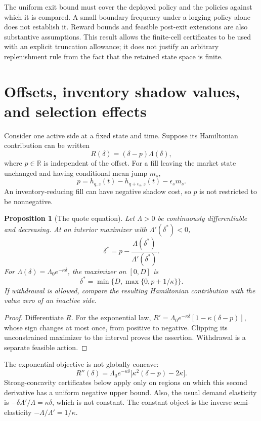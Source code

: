 \documentclass[11pt]{article}
\theoremstyle{plain}
\newtheorem{proposition}[theorem]{Proposition}
\theoremstyle{definition}
\theoremstyle{remark}
\newcommand{\R}{\mathbb R}
\begin{document}
The uniform exit bound must cover the deployed policy and the policies
against which it is compared. A small boundary frequency under a
logging policy alone does not establish it. Reward bounds and feasible
post-exit extensions are also substantive assumptions. This result
allows the finite-cell certificates to be used with an explicit
truncation allowance; it does not justify an arbitrary replenishment
rule from the fact that the retained state space is finite.

\section{Offsets, inventory shadow values, and selection effects}

Consider one active side at a fixed state and time. Suppose its
Hamiltonian contribution can be written
\[
R(\delta)=(\delta-p)\Lambda(\delta),
\]
where \(p\in\R\) is independent of the offset. For a fill leaving the
market state unchanged and having conditional mean jump \(m_s\),
\[
p=h_{q,z}(t)-h_{q+\epsilon_s,z}(t)-\epsilon_s m_s.
\]
An inventory-reducing fill can have negative shadow cost, so \(p\) is
not restricted to be nonnegative.

\begin{proposition}[The quote equation]\label{prop:quote}
Let \(\Lambda>0\) be continuously differentiable and decreasing.
At an interior maximizer with \(\Lambda'(\delta^\ast)<0\),
\[
\delta^\ast=p-\frac{\Lambda(\delta^\ast)}{\Lambda'(\delta^\ast)}.
\]
For \(\Lambda(\delta)=\Lambda_0e^{-\kappa\delta}\), the maximizer
on \([0,D]\) is
\[
\delta^\ast=\min\{D,\max\{0,p+1/\kappa\}\}.
\]
If withdrawal is allowed, compare the resulting Hamiltonian contribution
with the value zero of an inactive side.
\end{proposition}
\begin{proof}
Differentiate \(R\). For the exponential law,
\(R'=\Lambda_0e^{-\kappa\delta}[1-\kappa(\delta-p)]\), whose sign changes
at most once, from positive to negative. Clipping its unconstrained
maximizer to the interval proves the assertion. Withdrawal is a separate
feasible action.
\end{proof}

The exponential objective is not globally concave:
\[
R''(\delta)=
\Lambda_0e^{-\kappa\delta}
\big[\kappa^2(\delta-p)-2\kappa\big].
\]
Strong-concavity certificates below apply only on regions on which this
second derivative has a uniform negative upper bound.
Also, the usual demand elasticity is
\(-\delta\Lambda'/\Lambda=\kappa\delta\), which is not constant.
The constant object is the inverse semi-elasticity
\(-\Lambda/\Lambda'=1/\kappa\).
\end{document}
